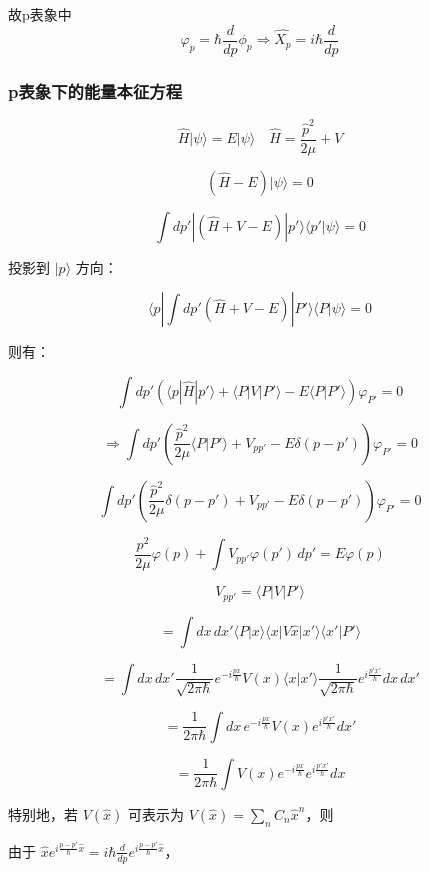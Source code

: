 \documentclass[lang=cn,10pt]{elegantbook}
\begin{document}
故p表象中
\begin{equation*}
	\varphi_p=\hbar\frac{d}{dp}\phi_p\Rightarrow \hat{X_p}=i\hbar\frac{d}{dp}
\end{equation*}

\subsubsection{p表象下的能量本征方程}

\[
\hat{H} | \psi \rangle = E | \psi \rangle \quad \hat{H} = \frac{\hat{p}^2}{2\mu} + V
\]

\[
(\hat{H} - E) | \psi \rangle = 0
\]

\[
\int dp'  | (\hat{H} + V - E) | p' \rangle \langle p' | \psi \rangle = 0
\]

投影到 $| p \rangle$ 方向：

\[
\langle p | \int dp' (\hat{H} + V - E) | P' \rangle \langle P | \psi \rangle = 0
\]

则有：

\[
\int dp' \left( \langle p | \hat{H} | p' \rangle + \langle P | V | P' \rangle - E \langle P | P' \rangle \right) \varphi_{P'} = 0
\]

\[
\Rightarrow \int dp' \left( \frac{\hat{p}^2}{2\mu} \langle P | P' \rangle + V_{pp'} - E \delta(p - p') \right) \varphi_{P'} = 0
\]

\[
\int dp' \left( \frac{\hat{p}^2}{2\mu} \delta(p - p') + V_{pp'} - E \delta(p - p') \right) \varphi_{P'} = 0
\]

\[
\frac{p^2}{2\mu}\varphi(p)  + \int V_{pp'} \varphi(p') \, dp' = E \varphi(p)
\]


\[
V_{pp'} = \langle P | V | P' \rangle
\]

\[
= \int dx \, dx' \langle P | x \rangle \langle x | V \hat{x} | x' \rangle \langle x' | P' \rangle
\]

\[
= \int dx \, dx' \frac{1}{\sqrt{2\pi \hbar}} e^{-i \frac{p x}{\hbar}} V(x) \langle x | x' \rangle \frac{1}{\sqrt{2\pi \hbar}} e^{i \frac{p' x'}{\hbar}} dx \, dx'
\]

\[
= \frac{1}{2\pi \hbar} \int dx \, e^{-i \frac{p x}{\hbar}} V(x)  e^{i \frac{p' x'}{\hbar}} dx'
\]

\[
= \frac{1}{2\pi \hbar} \int V(x) e^{-i \frac{p x}{\hbar}} e^{i \frac{p' x'}{\hbar}} dx
\]

特别地，若 $V(\hat{x})$ 可表示为 $V(\hat{x}) = \sum_n C_n \hat{x}^n$，则

由于 $\hat{x} e^{i \frac{p-p'}{\hbar} \hat{x}} = i \hbar \frac{d}{dp} e^{i \frac{p-p'}{\hbar} \hat{x}}$，
\end{document}
